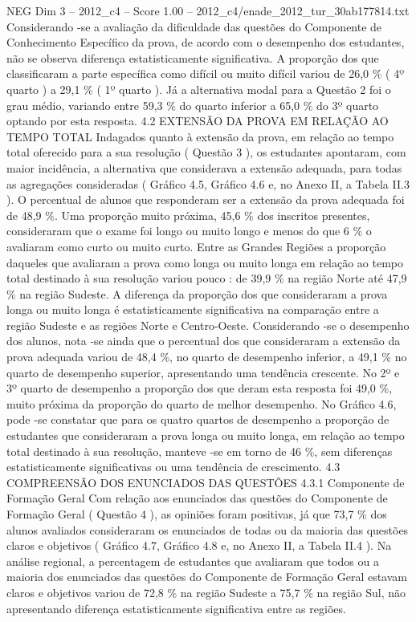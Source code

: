 \begin{textsample}{NEG Dim 3 – 2012\_c4 – Score 1.00 – 2012\_c4/enade\_2012\_tur\_30ab177814.txt}
Considerando -se a avaliação da dificuldade das questões do Componente de Conhecimento Específico da prova, de acordo com o desempenho dos estudantes, não se observa diferença estatisticamente significativa.
A proporção dos que classificaram a parte específica como difícil ou muito difícil variou de 26,0 \% ( 4º quarto ) a 29,1 \% ( 1º quarto ).
Já a alternativa modal para a Questão 2 foi o grau médio, variando entre 59,3 \% do quarto inferior a 65,0 \% do 3º quarto optando por esta resposta. 4.2 EXTENSÃO DA PROVA EM RELAÇÃO AO TEMPO TOTAL Indagados quanto à extensão da prova, em relação ao tempo total oferecido para a sua resolução ( Questão 3 ), os estudantes apontaram, com maior incidência, a alternativa que considerava a extensão adequada, para todas as agregações consideradas ( Gráfico 4.5, Gráfico 4.6 e, no Anexo II, a Tabela II.3 ).
O percentual de alunos que responderam ser a extensão da prova adequada foi de 48,9 \%.
Uma proporção muito próxima, 45,6 \% dos inscritos presentes, consideraram que o exame foi longo ou muito longo e menos do que 6 \% o avaliaram como curto ou muito curto.
Entre as Grandes Regiões a proporção daqueles que avaliaram a prova como longa ou muito longa em relação ao tempo total destinado à sua resolução variou pouco : de 39,9 \% na região Norte até 47,9 \% na região Sudeste.
A diferença da proporção dos que consideraram a prova longa ou muito longa é estatisticamente significativa na comparação entre a região Sudeste e as regiões Norte e Centro-Oeste.
Considerando -se o desempenho dos alunos, nota -se ainda que o percentual dos que consideraram a extensão da prova adequada variou de 48,4 \%, no quarto de desempenho inferior, a 49,1 \% no quarto de desempenho superior, apresentando uma tendência crescente.
No 2º e 3º quarto de desempenho a proporção dos que deram esta resposta foi 49,0 \%, muito próxima da proporção do quarto de melhor desempenho.
No Gráfico 4.6, pode -se constatar que para os quatro quartos de desempenho a proporção de estudantes que consideraram a prova longa ou muito longa, em relação ao tempo total destinado à sua resolução, manteve -se em torno de 46 \%, sem diferenças estatisticamente significativas ou uma tendência de crescimento. 4.3 COMPREENSÃO DOS ENUNCIADOS DAS QUESTÕES 4.3.1 Componente de Formação Geral Com relação aos enunciados das questões do Componente de Formação Geral ( Questão 4 ), as opiniões foram positivas, já que 73,7 \% dos alunos avaliados consideraram os enunciados de todas ou da maioria das questões claros e objetivos ( Gráfico 4.7, Gráfico 4.8 e, no Anexo II, a Tabela II.4 ).
Na análise regional, a percentagem de estudantes que avaliaram que todos ou a maioria dos enunciados das questões do Componente de Formação Geral estavam claros e objetivos variou de 72,8 \% na região Sudeste a 75,7 \% na região Sul, não apresentando diferença estatisticamente significativa entre as regiões.

\end{textsample}
